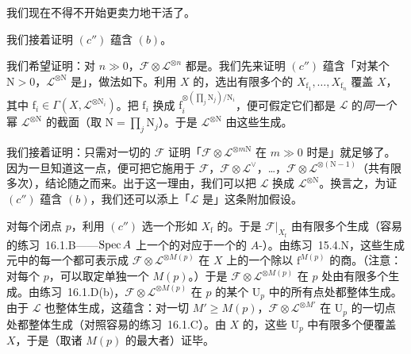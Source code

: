 我们现在不得不开始更卖力地干活了。

我们接着证明 $(c'')$ 蕴含 $(b)$。

我们希望证明：对 $n\gg 0$，$\mathscr{F}\otimes\mathscr{L}^{\otimes n}$ 都是\trGloballyGenerated。我们先来证明 $(c'')$ 蕴含「对某个 $\mathrm{N}>0$，$\mathscr{L}^{\otimes\mathrm{N}}$ 是\trGloballyGenerated」，做法如下。利用 $X$ 的\trQuasicompactness，选出有限多个\trAffine{}的 $X_{\mathrm{f}_1},\dots,X_{\mathrm{f}_n}$ 覆盖 $X$，其中 $\mathrm{f}_i\in\Gamma(X,\mathscr{L}^{\otimes\mathrm{N}_i})$。把 $\mathrm{f}_i$ 换成 $\mathrm{f}_i^{\otimes(\prod_j\mathrm{N}_j)/\mathrm{N}_i}$，便可假定它们都是 $\mathscr{L}$ 的\emph{同一个}幂 $\mathscr{L}^{\otimes\mathrm{N}}$ 的截面（取 $\mathrm{N}=\prod_j\mathrm{N}_j$）。于是 $\mathscr{L}^{\otimes\mathrm{N}}$ 由这些\trGlobalSections{}生成。

我们接着证明：只需对一切\trFiniteType{}的\trQCSheaf{} $\mathscr{F}$ 证明「$\mathscr{F}\otimes\mathscr{L}^{\otimes m\mathrm{N}}$ 在 $m\gg 0$ 时是\trGloballyGenerated」就足够了。因为一旦知道这一点，便可把它施用于 $\mathscr{F}$，$\mathscr{F}\otimes\mathscr{L}^{\vee}$，…，$\mathscr{F}\otimes\mathscr{L}^{\otimes(\mathrm{N}-1)}$（共有限多次），结论随之而来。出于这一理由，我们可以把 $\mathscr{L}$ 换成 $\mathscr{L}^{\otimes\mathrm{N}}$。换言之，为证 $(c'')$ 蕴含 $(b)$，我们还可以添上「$\mathscr{L}$ 是\trGloballyGenerated」这条附加假设。

对每个闭点 $p$，利用 $(c'')$ 选一个形如 $X_{\mathrm{f}}$ 的\trAffine\trOpen\trNeighborhood。于是 $\mathscr{F}|_{X_{\mathrm{f}}}$ 由有限多个\trGlobalSections{}生成（容易的\mbox{练习~16.1.B}——$\operatorname{Spec} A$ 上一个\trFiniteType{}的\trQCSheaf{}对应于一个\trFinitelyGenerated{}的 $A$-\trModule）。由\mbox{练习~15.4.N}，这些生成元中的每一个都可表示成 $\mathscr{F}\otimes\mathscr{L}^{\otimes M(p)}$ 在 $X$ 上的一个\trSection{}除以 $\mathrm{f}^{M(p)}$ 的商。（注意：对每个 $p$，可以取定单独一个 $M(p)$。）于是 $\mathscr{F}\otimes\mathscr{L}^{\otimes M(p)}$ 在 $p$ 处由有限多个\trGlobalSections{}生成。由\mbox{练习~16.1.D}(b)，$\mathscr{F}\otimes\mathscr{L}^{\otimes M(p)}$ 在 $p$ 的某个\trOpen\trNeighborhood{} $\mathrm{U}_p$ 中的所有点处都整体生成。由于 $\mathscr{L}$ 也整体生成，这蕴含：对一切 $M'\ge M(p)$，$\mathscr{F}\otimes\mathscr{L}^{\otimes M'}$ 在 $\mathrm{U}_p$ 的一切点处都整体生成（对照容易的\mbox{练习~16.1.C}）。由 $X$ 的\trQuasicompactness，这些 $\mathrm{U}_p$ 中有限多个便覆盖 $X$，于是（取诸 $M(p)$ 的最大者）证毕。

